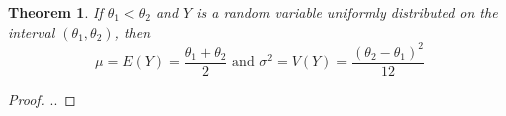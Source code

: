 \documentclass{article}
\theoremstyle{plain}
\newtheorem{thm}{Theorem}[section]
\theoremstyle{definition}
\theoremstyle{remark}
\begin{document}
\begin{thm}
  If $\theta_1 < \theta_2$ and $Y$ is a random variable uniformly distributed on the interval $(\theta_1, \theta_2)$, then
$$
\mu = E(Y) = \displaystyle \frac{\theta_1 + \theta_2}{2} \text{ and } \sigma^2 = V(Y) = \displaystyle \frac{(\theta_2 - \theta_1)^2}{12}
$$
\end{thm}
\begin{proof}
..
\end{proof}
\end{document}
